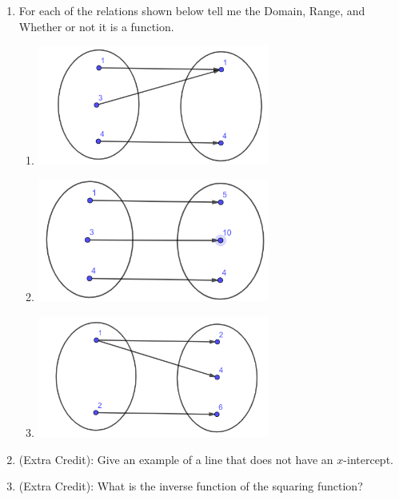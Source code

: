 \documentclass[12pt]{article}
\begin{document}
\begin{enumerate}
\item For each of the relations shown below tell me the Domain, Range, and Whether or not it is a function.
\begin{enumerate}
	\item \hspace{0.5in} \newline \includegraphics[width=3in]{alg-test3-img1.png}
	\item \hspace{0.5in} \newline \includegraphics[width=3in]{alg-test3-img2.png}
	\item \hspace{0.5in} \newline \includegraphics[width=3in]{alg-test3-img3.png}
\end{enumerate}

\item (Extra Credit): Give an example of a line that does not have an \newline $x$-intercept.

\item (Extra Credit): What is the inverse function of the squaring function?
\end{enumerate}
\end{document}
